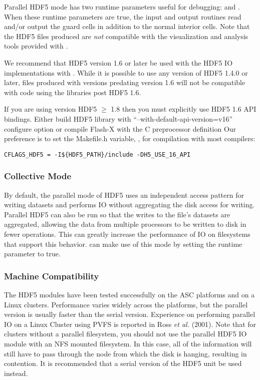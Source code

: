 Parallel HDF5 mode has two runtime parameters useful for debugging:
 and .  When 
these runtime parameters
are true, the \flashx input and output routines read and/or output the guard cells
in addition to the normal interior cells.  Note that the HDF5 files produced are {\em not} 
compatible with the visualization and analysis tools provided with \flashx.


\begin{flashtip}
We recommend that HDF5 version 1.6 or later be used with the HDF5 IO 
implementations with \flashx.  While it is possible to use any version of
HDF5 1.4.0 or later, files produced with versions predating version 1.6 will 
not be compatible with code using the libraries post HDF5 1.6. 
\end{flashtip}

\begin{flashtip}[Caution]
If you are using version HDF5 $\ge$ 1.8 then you must explicitly use
HDF5 1.6 API bindings.  Either build HDF5 library with
``--with-default-api-version=v16'' configure option or compile Flash-X
with the C preprocessor definition %
Our preference is
to set the  Makefile.h variable, \eg, for compilation with most compilers:
\begin{verbatim}
CFLAGS_HDF5 = -I${HDF5_PATH}/include -DH5_USE_16_API
\end{verbatim}
\end{flashtip}


\subsubsection{Collective Mode}
\label{sec:IOCollectiveMode}
By default, the parallel mode of HDF5 uses an independent access pattern for 
writing datasets and performs IO without aggregating the disk access for 
writing.  Parallel HDF5 can also be run so that the writes to the file's 
datasets are aggregated, allowing the data
from multiple processors to be written to disk in fewer operations.  This can 
greatly increase the performance of IO on filesystems that support this behavior.
  \flashx can make use of this mode by setting the runtime parameter  to true.


\subsubsection{Machine Compatibility}
The HDF5 modules have been tested successfully on the ASC platforms
and on a Linux clusters.  Performance varies widely across the
platforms, but the parallel version is usually faster than the serial
version.  Experience on performing parallel IO on a Linux Cluster
using PVFS is reported in Ross {\it et al.} (2001).  Note that for
clusters without a parallel filesystem, you should not use the
parallel HDF5 IO module with an NFS mounted filesystem.  In this
case, all of the information will still have to pass through the node
from which the disk is hanging, resulting in contention.  It is
recommended that a serial version of the HDF5 unit be used instead. 


